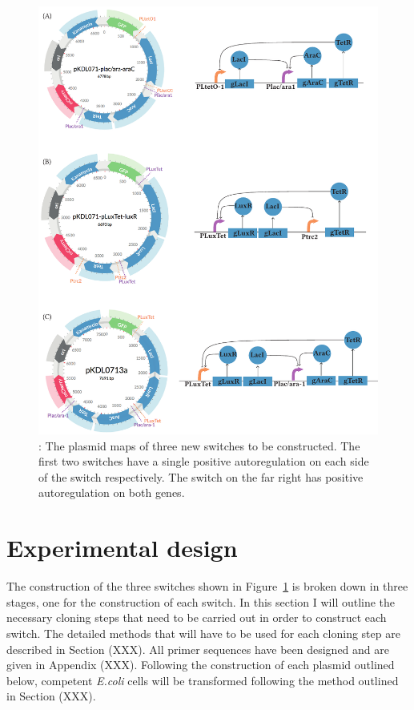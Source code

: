 \begin{figure}[htbp]
	\begin{center}
		\includegraphics[scale=0.7]{../../chapters/chapterDesignSwitches/images/final-plasmids.pdf}
		\caption[The plasmid maps of three new switches to be constructed.]{\label{fig:finalpl}: The plasmid maps of three new switches to be constructed. The first two switches have a single positive autoregulation on each side of the switch respectively. The switch on the far right has positive autoregulation on both genes. }
	\end{center}
\end{figure}

\section{Experimental design}

The construction of the three switches shown in Figure~\ref{fig:finalpl} is broken down in three stages, one for the construction of each switch. In this section I will outline the necessary cloning steps that need to be carried out in order to construct each switch. The detailed methods that will have to be used for each cloning step are described in Section (XXX). All primer sequences have been designed and are given in Appendix (XXX). Following the construction of each plasmid outlined below, competent \textit{E.coli} cells will be transformed following the method outlined in Section (XXX).

